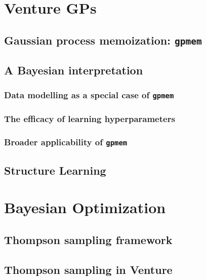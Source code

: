 \documentclass[twoside,11pt]{article}
\newcommand{\gpmem}{\texttt{gpmem}}
\begin{document}
\section{Venture GPs}




\subsection{Gaussian process memoization: \gpmem}


\subsection{A Bayesian interpretation}




\subsubsection{Data modelling as a special case of \gpmem}

\subsubsection{The efficacy of learning hyperparameters}

\subsubsection{Broader applicability of \gpmem}\label{sec:gpmem-broader}

\subsection{Structure Learning}\label{sec:structurelearning}


\FloatBarrier
\section{Bayesian Optimization}

\subsection{Thompson sampling framework}

\subsection{Thompson sampling in Venture}

\end{document}
